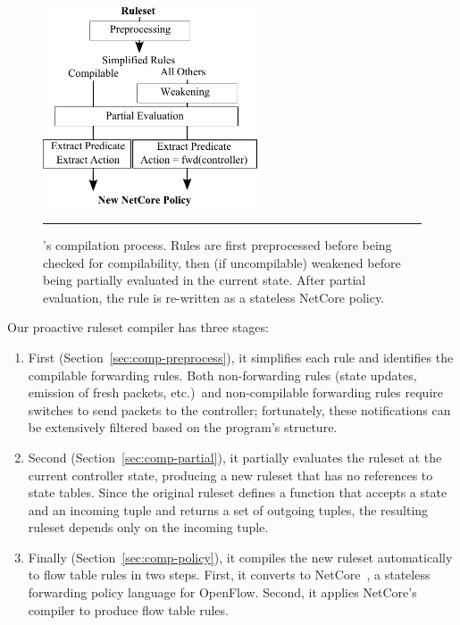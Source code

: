 \begin{figure}
\centering
\includegraphics[width=2.5in]{figs/flowlog-compilation.pdf}
\caption{\small \flowlog's compilation process. Rules are first preprocessed before
being checked for compilability, then (if uncompilable) weakened before being
partially evaluated in the current state. After partial evaluation, the rule
is re-written as a stateless NetCore policy.}
\label{fig:compilation}
\hrule
\end{figure}

Our proactive ruleset compiler has three stages:
\begin{enumerate}

\item First (Section~\ref{sec:comp-preprocess}), it simplifies each rule
and identifies the compilable forwarding rules.
Both non-forwarding rules (state updates, emission of fresh packets,
etc.)\ 
and non-compilable forwarding rules require switches to
send packets to the controller; fortunately, these notifications can be extensively
filtered based on the program's structure.

\item Second (Section~\ref{sec:comp-partial}), it partially evaluates the ruleset at the current controller state, 
producing a new ruleset that has no references to state tables. Since the
original ruleset defines a function that accepts a state and an incoming tuple and
returns a set of outgoing tuples, the resulting ruleset depends only on the incoming tuple.

\item Finally (Section~\ref{sec:comp-policy}), it compiles the new ruleset automatically to flow table rules in two steps. 
First, it
converts to NetCore~\cite{monsanto:popl12-netcore}, a stateless forwarding policy language for OpenFlow.
Second, it applies NetCore's compiler to produce flow table rules. 

\end{enumerate}

